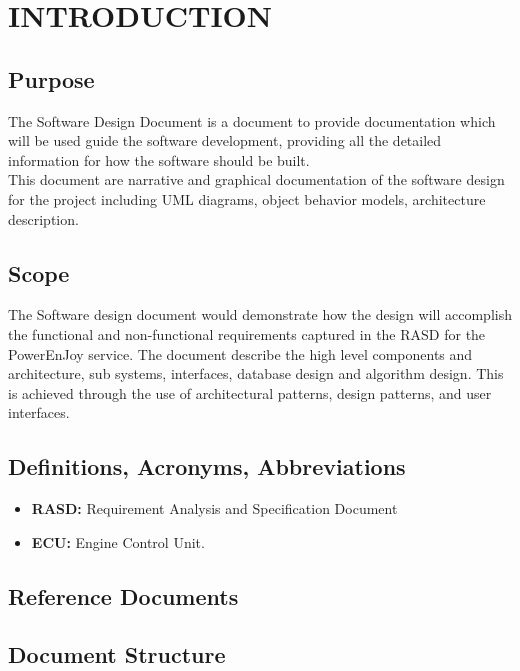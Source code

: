 \section{INTRODUCTION}
\subsection{Purpose}
The Software Design Document is a document to provide documentation which will be used guide the software development, providing all the detailed information for how the software should be built.\\
This document are narrative and graphical documentation of the software design for the project including UML diagrams, object behavior models, architecture description.
\subsection{Scope}
The Software design document would demonstrate how the design will accomplish the functional and non-functional requirements captured in the RASD for the PowerEnJoy service.
The document describe the high level components and architecture, sub systems, interfaces, database design and algorithm design. This is achieved through the use of architectural patterns, design patterns, and user interfaces. 
\subsection{Definitions, Acronyms, Abbreviations}
\begin{itemize}
	\item \textbf{RASD:} Requirement Analysis and Specification Document
	\item \textbf{ECU:} Engine Control Unit. 

\end{itemize}
\subsection{Reference Documents}

\subsection{Document Structure }



\newpage